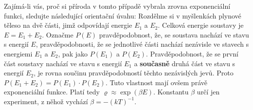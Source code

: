 \begin{example}
  Zajímá-li vás, proč si příroda v tomto případě vybrala zrovna exponenciální funkci, sledujte 
  následující orientační úvahu: Rozdělme si v myšlenkách plynové těleso na dvě části, jimž 
  odpovídají energie \(E_1\) a \(E_2\). Celková energie soustavy je \(E = E_1 + E_2\). Označme 
  \(P(E)\) pravděpodobnost, že, se soustava nachází ve stavu s energií \(E\), pravděpodobnosti, že 
  se jednotlivé části nachází nezávisle ve stavech s energiemi \(E_1\) a \(E_2\), pak jako
  \(P(E_1)\) a \(P(E_2)\). Pravděpodobnost, že se první část soustavy nachází ve stavu s energií 
  \(E_1\) a \textbf{současně} druhá část ve stavu s energií \(E_2\), je rovna součinu 
  pravděpodobností těchto nezávislých jevů. Proto \(P(E_1 + E_2) = P(E_1) \cdot P(E_2)\). Tuto 
  vlastnost mají ovšem právě exponenciální funkce. Platí tedy \(\varrho \approx\exp(\beta E)\). 
  Konstantu \(\beta\) určí jen experiment, z něhož vychází \(\beta = - (kT)^{-1}\).
  

\end{example}
